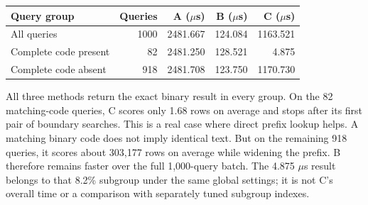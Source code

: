\begin{center}\small
\begin{tabular}{@{}lrrrr@{}}\toprule
Query group & Queries & A ($\mu$s) & B ($\mu$s) & C ($\mu$s)\\\midrule
All queries & 1000 & 2481.667 & 124.084 & 1163.521\\
Complete code present & 82 & 2481.250 & 128.521 & 4.875\\
Complete code absent & 918 & 2481.708 & 123.750 & 1170.730\\\bottomrule
\end{tabular}
\end{center}
All three methods return the exact binary result in every group. On the 82 matching-code queries, C scores only 1.68 rows on average and stops after its first pair of boundary searches. This is a real case where direct prefix lookup helps. A matching binary code does not imply identical text. But on the remaining 918 queries, it scores about 303,177 rows on average while widening the prefix. B therefore remains faster over the full 1,000-query batch. The 4.875 $\mu$s result belongs to that 8.2\% subgroup under the same global settings; it is not C's overall time or a comparison with separately tuned subgroup indexes.
